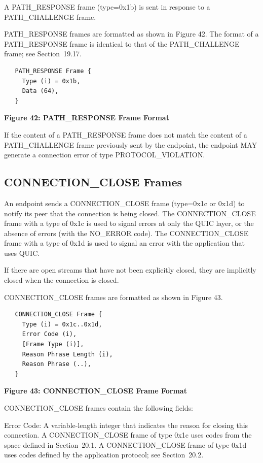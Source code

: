 \documentclass{article}
\begin{document}
A PATH\_RESPONSE frame (type=0x1b) is sent in response to a PATH\_CHALLENGE frame.

PATH\_RESPONSE frames are formatted as shown in Figure 42.  The format of a PATH\_RESPONSE frame is identical to that of the PATH\_CHALLENGE frame; see Section~19.17.

\begin{verbatim}
   PATH_RESPONSE Frame {
     Type (i) = 0x1b,
     Data (64),
   }
\end{verbatim}

\begin{center}
\textbf{Figure 42: PATH\_RESPONSE Frame Format}
\end{center}

If the content of a PATH\_RESPONSE frame does not match the content of a PATH\_CHALLENGE frame previously sent by the endpoint, the endpoint MAY generate a connection error of type PROTOCOL\_VIOLATION.

\subsection{CONNECTION\_CLOSE Frames}

An endpoint sends a CONNECTION\_CLOSE frame (type=0x1c or 0x1d) to notify its peer that the connection is being closed.  The CONNECTION\_CLOSE frame with a type of 0x1c is used to signal errors at only the QUIC layer, or the absence of errors (with the NO\_ERROR code).  The CONNECTION\_CLOSE frame with a type of 0x1d is used to signal an error with the application that uses QUIC.

If there are open streams that have not been explicitly closed, they are implicitly closed when the connection is closed.

CONNECTION\_CLOSE frames are formatted as shown in Figure 43.

\begin{verbatim}
   CONNECTION_CLOSE Frame {
     Type (i) = 0x1c..0x1d,
     Error Code (i),
     [Frame Type (i)],
     Reason Phrase Length (i),
     Reason Phrase (..),
   }
\end{verbatim}

\begin{center}
\textbf{Figure 43: CONNECTION\_CLOSE Frame Format}
\end{center}

CONNECTION\_CLOSE frames contain the following fields:

Error Code:  A variable-length integer that indicates the reason for closing this connection.  A CONNECTION\_CLOSE frame of type 0x1c uses codes from the space defined in Section~20.1.  A CONNECTION\_CLOSE frame of type 0x1d uses codes defined by the application protocol; see Section~20.2.
\end{document}
